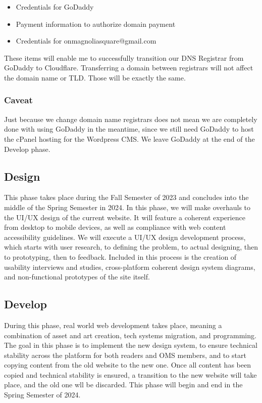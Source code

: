 \begin{itemize}
    \item Credentials for GoDaddy
    \item Payment information to authorize domain payment
    \item Credentials for onmagnoliasquare@gmail.com
\end{itemize}

These items will enable me to successfully transition our DNS Registrar from GoDaddy to Cloudflare. Transferring a domain between registrars will not affect the domain name or TLD. Those will be exactly the same.

\subsubsection*{Caveat}
Just because we change domain name registrars does not mean we are completely done with using GoDaddy in the meantime, since we still need GoDaddy to host the cPanel hosting for the Wordpress CMS. We leave GoDaddy at the end of the Develop phase.

\subsection{Design}
This phase takes place during the Fall Semester of 2023 and concludes into the middle of the Spring Semester in 2024. In this phase, we will make overhauls to the UI/UX design of the current website. It will feature a coherent experience from desktop to mobile devices, as well as compliance with web content accessibility guidelines. We will execute a UI/UX design development process, which starts with user research, to defining the problem, to actual designing, then to prototyping, then to feedback. Included in this process is the creation of usability interviews and studies, cross-platform coherent design system diagrams, and non-functional prototypes of the site itself.

\subsection{Develop}
During this phase, real world web development takes place, meaning a combination of asset and art creation, tech systems migration, and programming. The goal in this phase is to implement the new design system, to ensure technical stability across the platform for both readers and OMS members, and to start copying content from the old website to the new one. Once all content has been copied and technical stability is ensured, a transition to the new website will take place, and the old one wll be discarded. This phase will begin and end in the Spring Semester of 2024.


